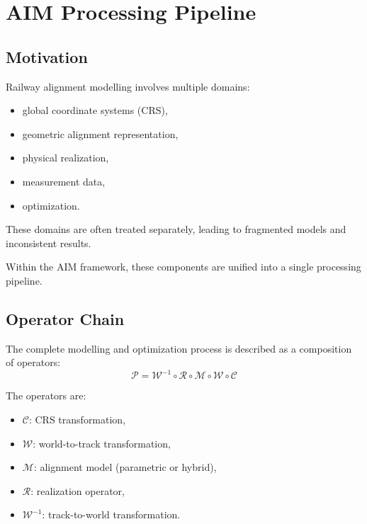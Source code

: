 
\section{AIM Processing Pipeline}

\subsection*{Motivation}

Railway alignment modelling involves multiple domains:
\begin{itemize}
\item global coordinate systems (CRS),
\item geometric alignment representation,
\item physical realization,
\item measurement data,
\item optimization.
\end{itemize}

These domains are often treated separately, leading to fragmented models
and inconsistent results.

Within the AIM framework, these components are unified into a single
processing pipeline.

\subsection{Operator Chain}

\begin{definition}
The complete modelling and optimization process is described as a
composition of operators:
\[
\boxed{
\mathcal{P}
=
\mathcal{W}^{-1}
\circ
\mathcal{R}
\circ
\mathcal{M}
\circ
\mathcal{W}
\circ
\mathcal{C}
}
\]
\end{definition}

The operators are:
\begin{itemize}
\item \(\mathcal{C}\): CRS transformation,
\item \(\mathcal{W}\): world-to-track transformation,
\item \(\mathcal{M}\): alignment model (parametric or hybrid),
\item \(\mathcal{R}\): realization operator,
\item \(\mathcal{W}^{-1}\): track-to-world transformation.
\end{itemize}


